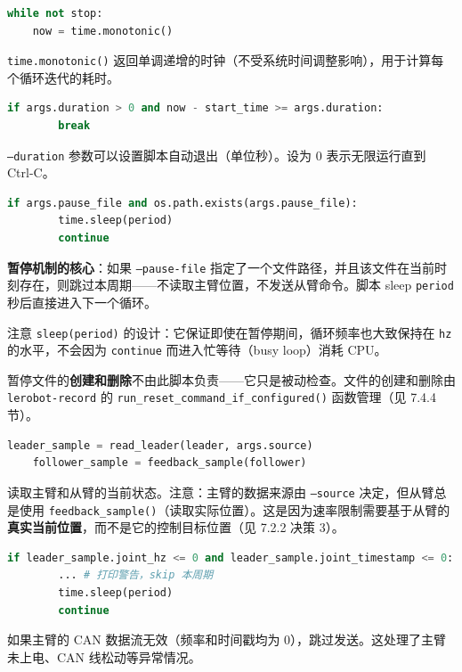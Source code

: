 \documentclass[UTF8,a4paper,11pt]{ctexart}
\begin{document}
{\begin{lstlisting}[language=python]
while not stop:
    now = time.monotonic()
\end{lstlisting}

\texttt{time.monotonic()} 返回单调递增的时钟（不受系统时间调整影响），用于计算每个循环迭代的耗时。

\begin{lstlisting}[language=python]
    if args.duration > 0 and now - start_time >= args.duration:
        break
\end{lstlisting}

\texttt{--duration} 参数可以设置脚本自动退出（单位秒）。设为 0 表示无限运行直到 Ctrl-C。

\begin{lstlisting}[language=python]
    if args.pause_file and os.path.exists(args.pause_file):
        time.sleep(period)
        continue
\end{lstlisting}

\textbf{暂停机制的核心}：如果 \texttt{--pause-file} 指定了一个文件路径，并且该文件在当前时刻存在，则跳过本周期——不读取主臂位置，不发送从臂命令。脚本 sleep \texttt{period} 秒后直接进入下一个循环。

注意 \texttt{sleep(period)} 的设计：它保证即使在暂停期间，循环频率也大致保持在 \texttt{hz} 的水平，不会因为 \texttt{continue} 而进入忙等待（busy loop）消耗 CPU。

暂停文件的\textbf{创建和删除}不由此脚本负责——它只是被动检查。文件的创建和删除由 \texttt{lerobot-record} 的 \texttt{run_reset_command_if_configured()} 函数管理（见 7.4.4 节）。

\begin{lstlisting}[language=python]
    leader_sample = read_leader(leader, args.source)
    follower_sample = feedback_sample(follower)
\end{lstlisting}

读取主臂和从臂的当前状态。注意：主臂的数据来源由 \texttt{--source} 决定，但从臂总是使用 \texttt{feedback_sample()}（读取实际位置）。这是因为速率限制需要基于从臂的\textbf{真实当前位置}，而不是它的控制目标位置（见 7.2.2 决策 3）。

\begin{lstlisting}[language=python]
    if leader_sample.joint_hz <= 0 and leader_sample.joint_timestamp <= 0:
        ... # 打印警告，skip 本周期
        time.sleep(period)
        continue
\end{lstlisting}

如果主臂的 CAN 数据流无效（频率和时间戳均为 0），跳过发送。这处理了主臂未上电、CAN 线松动等异常情况。

}
\end{document}
